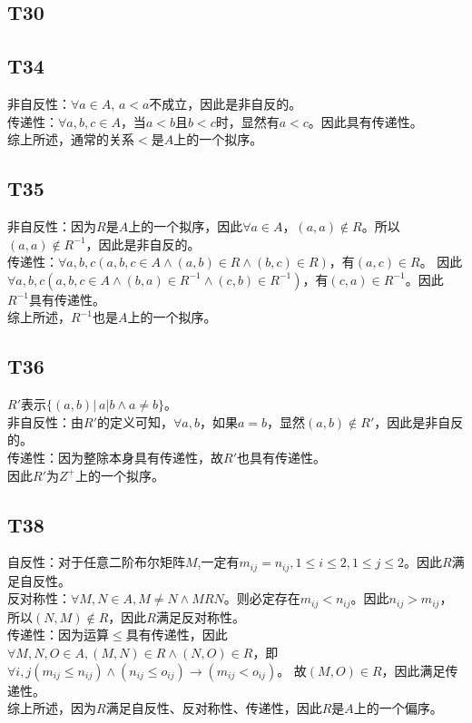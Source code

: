 \documentclass{article}
\begin{document}
\subsection{T30}
\subsection{T34}
非自反性：$\forall a \in A$, $a < a$不成立，因此是非自反的。\\
传递性：$\forall a, b, c \in A$，当$a < b$且$b < c$时，显然有$a < c$。因此具有传递性。\\
综上所述，通常的关系$<$是$A$上的一个拟序。
\subsection{T35}
非自反性：因为$R$是$A$上的一个拟序，因此$\forall a \in A$，$(a, a) \notin R$。所以$(a, a) \notin R^{-1}$，因此是非自反的。\\
传递性：$\forall a, b, c(a, b, c \in A \land (a, b) \in R \land (b, c) \in R)$，有$(a, c) \in R$。
因此$\forall a, b, c(a, b, c \in A \land (b, a) \in R^{-1} \land (c, b) \in R^{-1})$，有$(c, a) \in R^{-1}$。因此$R^{-1}$具有传递性。\\
综上所述，$R^{-1}$也是$A$上的一个拟序。
\subsection{T36}
$R'$表示$\{(a, b) |\ a | b \land a \neq b\}$。\\
非自反性：由$R'$的定义可知，$\forall a, b$，如果$a = b$，显然$(a, b) \notin R'$，因此是非自反的。\\
传递性：因为整除本身具有传递性，故$R'$也具有传递性。\\
因此$R'$为$Z^+$上的一个拟序。
\subsection{T38}
自反性：对于任意二阶布尔矩阵$M$,一定有$m_{ij} = n_{ij}, 1\leq i \leq 2, 1 \leq j \leq 2$。因此$R$满足自反性。\\
反对称性：$\forall M, N \in A, M \neq N \land M R N$。则必定存在$m_{ij} < n_{ij}$。因此$n_{ij} > m_{ij}$，所以$(N, M) \notin R$，因此$R$满足反对称性。\\
传递性：因为运算$\leq$具有传递性，因此$\forall M, N, O \in A, (M, N) \in R \land (N, O) \in R$，即$\forall i, j (m_{ij} \leq n_{ij}) \land (n_{ij} \leq o_{ij}) \rightarrow (m_{ij} < o_{ij})$。
故$(M, O) \in R$，因此满足传递性。\\
综上所述，因为$R$满足自反性、反对称性、传递性，因此$R$是$A$上的一个偏序。
\end{document}
